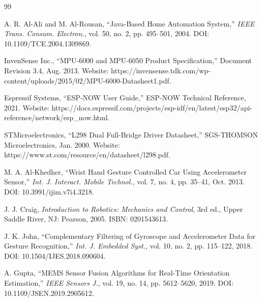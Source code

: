 \documentclass[12pt,a4paper,oneside]{report}
\begin{document}
\clearpage
\begin{singlespace}
\begin{thebibliography}{99}
\fontsize{10}{12}\selectfont
\setlength{\itemsep}{4pt}
\setlength{\parsep}{0pt}

A. R. Al-Ali and M. Al-Rousan, ``Java-Based Home Automation System,'' \textit{IEEE Trans. Consum. Electron.}, vol. 50, no. 2, pp. 495--501, 2004. DOI: 10.1109/TCE.2004.1309869.

InvenSense Inc., ``MPU-6000 and MPU-6050 Product Specification,'' Document Revision 3.4, Aug. 2013. Website: https://invensense.tdk.com/wp-content/uploads/2015/02/MPU-6000-Datasheet1.pdf.

Espressif Systems, ``ESP-NOW User Guide,'' ESP-NOW Technical Reference, 2021. Website: https://docs.espressif.com/projects/esp-idf/en/latest/esp32/api-reference/network/esp\_now.html.

STMicroelectronics, ``L298 Dual Full-Bridge Driver Datasheet,'' SGS-THOMSON Microelectronics, Jan. 2000. Website: https://www.st.com/resource/en/datasheet/l298.pdf.

M. A. Al-Khedher, ``Wrist Hand Gesture Controlled Car Using Accelerometer Sensor,'' \textit{Int. J. Interact. Mobile Technol.}, vol. 7, no. 4, pp. 35--41, Oct. 2013. DOI: 10.3991/ijim.v7i4.3218.

J. J. Craig, \textit{Introduction to Robotics: Mechanics and Control}, 3rd ed., Upper Saddle River, NJ: Pearson, 2005. ISBN: 0201543613.

J. K. John, ``Complementary Filtering of Gyroscope and Accelerometer Data for Gesture Recognition,'' \textit{Int. J. Embedded Syst.}, vol. 10, no. 2, pp. 115--122, 2018. DOI: 10.1504/IJES.2018.090604.

A. Gupta, ``MEMS Sensor Fusion Algorithms for Real-Time Orientation Estimation,'' \textit{IEEE Sensors J.}, vol. 19, no. 14, pp. 5612--5620, 2019. DOI: 10.1109/JSEN.2019.2905612.

\end{thebibliography}
\end{singlespace}
\end{document}
